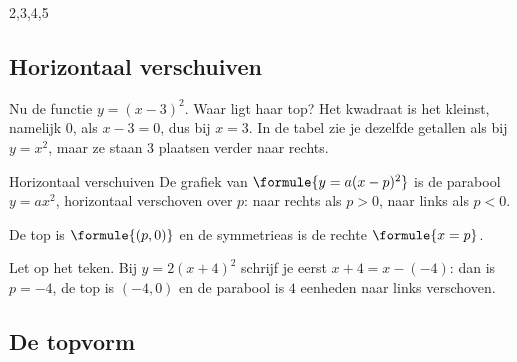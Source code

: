 \begin{alleenvoor}{2,3,4,5}
\subsection{Horizontaal verschuiven}

Nu de functie $y = (x - 3)^2$. Waar ligt haar top? Het kwadraat is het kleinst, namelijk $0$, als $x - 3 = 0$, dus bij $x = 3$. In de tabel zie je dezelfde getallen als bij $y = x^2$, maar ze staan $3$ plaatsen verder naar rechts.


\begin{theorie}
\begin{stelling}{Horizontaal verschuiven}
De grafiek van $\formule{y = a(x - p)^2}$ is de parabool $y = ax^2$, horizontaal verschoven over $p$: naar rechts als $p > 0$, naar links als $p < 0$.

De top is $\formule{(p, 0)}$ en de symmetrieas is de rechte $\formule{x = p}$.
\end{stelling}
\end{theorie}

Let op het teken. Bij $y = 2(x + 4)^2$ schrijf je eerst $x + 4 = x - (-4)$: dan is $p = -4$, de top is $(-4, 0)$ en de parabool is $4$ eenheden naar links verschoven.

\begin{oefeningen}
\end{oefeningen}

\subsection{De topvorm}


\end{alleenvoor}
